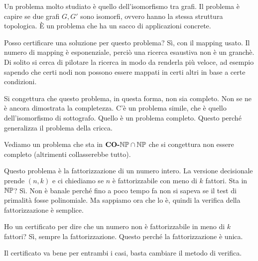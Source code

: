 Un problema molto studiato è quello dell'isomorfismo tra grafi. Il problema è capire se due grafi
$G,G'$ sono isomorfi, ovvero hanno la stessa struttura topologica. È un problema che ha un sacco di
applicazioni concrete.

Posso certificare una soluzione per questo problema? Sì, con il mapping usato. Il numero di mapping
è esponenziale, perciò una ricerca esaustiva non è un granchè. Di solito si cerca di pilotare la
ricerca in modo da renderla più veloce, ad esempio sapendo che certi nodi non possono essere
mappati in certi altri in base a certe condizioni.

Si congettura che questo problema, in questa forma, non sia completo. Non se ne è ancora dimostrata
la completezza. C'è un problema simile, che è quello dell'isomorfismo di sottografo. Quello è un
problema completo. Questo perché generalizza il problema della cricca.

Vediamo un problema che sta in $\textbf{CO-}\mathbb{NP} \cap \mathbb{NP}$ che si congettura non essere completo
(altrimenti collasserebbe tutto).

Questo problema è la fattorizzazione di un numero intero. La versione decisionale prende $(n,k)$ e
ci chiediamo se $n$ è fattorizzabile con meno di $k$ fattori. Sta in $\mathbb{NP}$? Sì. Non è banale
perché fino a poco tempo fa non si sapeva se il test di primalità fosse polinomiale. Ma sappiamo
ora che lo è, quindi la verifica della fattorizzazione è semplice.

Ho un certificato per dire che un numero non è fattorizzabile in meno di $k$ fattori? Sì, sempre
la fattorizzazione. Questo perché la fattorizzazione è unica.

Il certificato va bene per entrambi i casi, basta cambiare il metodo di verifica.
